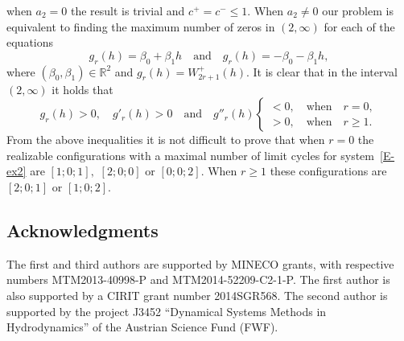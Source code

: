 \documentclass[12pt,psamsfonts]{amsart}
\begin{document}
when $a_2=0$ the result is trivial and $c^+=c^-\le1.$ When $a_2\ne0$  our problem is equivalent to
finding the maximum number of zeros in $(2,\infty)$ for each of the equations
\[
g_r(h)=\beta_0+\beta_1 h\quad \mbox{and}\quad g_r(h)=-\beta_0-\beta_1 h,
\]
where  $(\beta_0,\beta_1)\in{\mathbb{R}}^2$ and  $g_r(h)=W_{2r+1}^+(h)$. It is clear that in the interval
$(2,\infty)$ it holds that
\[
g_r(h)>0,\quad  g'_r(h)>0 \quad\mbox{and}\quad g''_r(h)\begin{cases} <0, \quad\mbox{when}\quad
r=0,\\>0,\quad\mbox{when}\quad r\ge1.\end{cases}
\]
From the above inequalities it is not difficult to prove that when $r=0$ the realizable
configurations with a maximal number of limit cycles for system~\eqref{E-ex2} are $[1;0;1],$ $[2;0;0]$
or
$[0;0;2]$. When $r\ge1$ these configurations are $[2;0;1]$ or $[1;0;2].$

\subsection*{Acknowledgments}

The first and third authors are supported by  MINECO grants, with respective  numbers
MTM2013-40998-P and MTM2014-52209-C2-1-P. The first  author is also supported by a CIRIT grant
number 2014SGR568. The second author is  supported by the
 project J3452 ``Dynamical Systems Methods in Hydrodynamics'' of the Austrian Science Fund (FWF).
\end{document}
